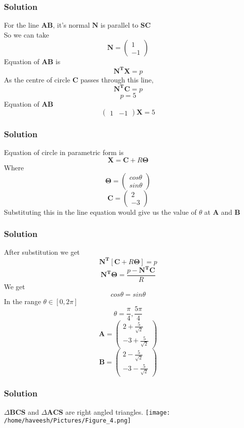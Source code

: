 \documentclass{beamer}
\begin{document}
\begin{frame}
\frametitle{Solution}
For the line \textbf{AB}, it's normal $\mathbf{{N}}$ is parallel to $\mathbf{SC} $ \\
So we can take 
$$ \mathbf{N} = \left(\begin{matrix}
1 \\
-1
\end{matrix} \right) $$ 
Equation of \textbf{AB} is 
$$ \mathbf{N^TX} = p $$
As the centre of circle \textbf{C} passes through this line, 
$$ \mathbf{N^TC} = p$$
$$ p = 5 $$ 
Equation of \textbf{AB}
$$ \left(\begin{matrix}
1 & -1
\end{matrix} \right)
\mathbf{X} = 5 $$
\end{frame}

\begin{frame}
\frametitle{Solution}
Equation of circle in parametric form is
$$ \mathbf{X} = \mathbf{C} + R\mathbf{{\Theta}} $$
Where
$$ \mathbf{\Theta} = \left(\begin{matrix}
cos\theta \\
sin\theta
\end{matrix} \right) $$
$$ \mathbf{C} = \left(\begin{matrix}
2 \\
-3
\end{matrix} \right) $$
Substituting this in the line equation would give us the value of $\theta$ at \textbf{A} and \textbf{B}
\end{frame}

\begin{frame}
\frametitle{Solution}
After substitution we get 
$$ \mathbf{N^T}\left[\mathbf{C}+R\mathbf{{\Theta}}\right]= p $$ 
$$ \mathbf{N^T\Theta} = \frac{p-\mathbf{N^TC}}{R}  $$
We get
$$ cos\theta = sin\theta $$
In the range $\theta\in\left[0,2\pi\right]$ 
$$ \theta = \frac{\pi}{4},\frac{5\pi}{4} $$
$$ \mathbf{A} = \left(\begin{matrix}
2+\frac{5}{\sqrt{2}} \\
-3+\frac{5}{\sqrt{2}}
\end{matrix} \right) $$
$$ \mathbf{B} = \left(\begin{matrix}
2-\frac{5}{\sqrt{2}} \\
-3-\frac{5}{\sqrt{2}}
\end{matrix} \right) $$
\end{frame}

\begin{frame}
\frametitle{Solution}
$\Delta\mathbf{BCS}$ and $\Delta\mathbf{ACS}$ are right angled triangles.
\texttt{[image: /home/haveesh/Pictures/Figure\_4.png]}
\end{frame}
\end{document}
